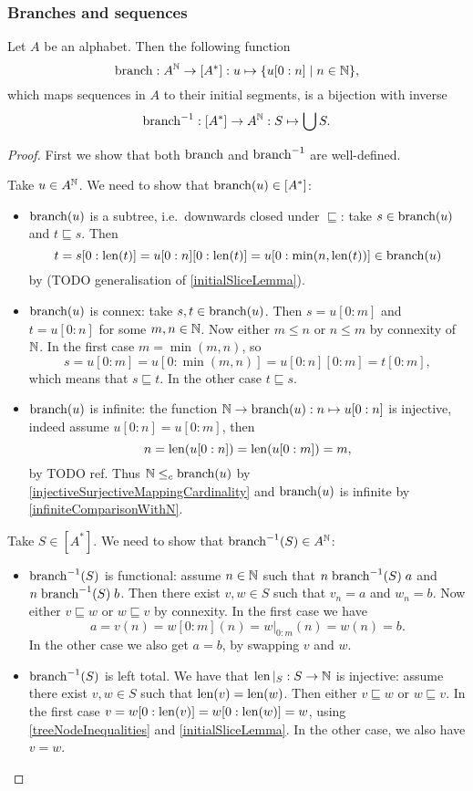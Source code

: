 \subsubsection{Branches and sequences}
\begin{proposition}
Let $A$ be an alphabet. Then the following function
\[ \branch: A^\N \to [A^*]: u \mapsto \setbuilder{u[0:n]}{n\in \N}, \]
which maps sequences in $A$ to their initial segments, is a bijection with inverse
\[ \operatorname{branch}^{-1}: [A^*] \to A^{\mathbb{N}}: S\mapsto \bigcup S. \]
\end{proposition}
\begin{proof}
First we show that both $\operatorname{branch}$ and $\operatorname{branch}^{-1}$ are well-defined.

Take $u\in A^{\mathbb{N}}$. We need to show that $\operatorname{branch}(u)\in[A^*]$:
\begin{itemize}
\item $\operatorname{branch}(u)$ is a subtree, i.e.\ downwards closed under $\sqsubseteq$: take $s\in \operatorname{branch}(u)$ and $t\sqsubseteq s$. Then 
\[ t = s[0:\operatorname{len}(t)] = u[0:n][0:\operatorname{len}(t)] = u[0:\min(n, \operatorname{len}(t))] \in \operatorname{branch}(u) \]
by (TODO generalisation of \ref{initialSliceLemma}).
\item $\operatorname{branch}(u)$ is connex: take $s,t\in \operatorname{branch}(u)$. Then $s = u[0:m]$ and $t = u[0:n]$ for some $m,n\in \mathbb{N}$. Now either $m\leq n$ or $n\leq m$ by connexity of $\mathbb{N}$. In the first case $m = \min(m,n)$, so
\[ s = u[0:m] = u[0:\min(m,n)] = u[0:n][0:m] = t[0:m], \]
which means that $s\sqsubseteq t$. In the other case $t\sqsubseteq s$.
\item $\operatorname{branch}(u)$ is infinite: the function $\mathbb{N}\to \operatorname{branch}(u): n\mapsto u[0:n]$ is injective, indeed assume $u[0:n] = u[0:m]$, then
\[ n = \operatorname{len}(u[0:n]) = \operatorname{len}(u[0:m]) = m, \]
by TODO ref. Thus $\mathbb{N}\leq_c \operatorname{branch}(u)$ by \ref{injectiveSurjectiveMappingCardinality} and $\operatorname{branch}(u)$ is infinite by \ref{infiniteComparisonWithN}.
\end{itemize}

Take $S\in [A^*]$. We need to show that $\operatorname{branch}^{-1}(S)\in A^{\mathbb{N}}$:
\begin{itemize}
\item $\operatorname{branch}^{-1}(S)$ is functional: assume $n\in \mathbb{N}$ such that $n\mathrel{\operatorname{branch}^{-1}(S)}a$ and $n\mathrel{\operatorname{branch}^{-1}(S)}b$. Then there exist $v,w\in S$ such that $v_n = a$ and $w_n = b$. Now either $v \sqsubseteq w$ or $w\sqsubseteq v$ by connexity. In the first case we have
\[ a = v(n) = w[0:m](n) = w|_{0:m}(n) = w(n) = b. \]
In the other case we also get $a=b$, by swapping $v$ and $w$.
\item $\operatorname{branch}^{-1}(S)$ is left total. We have that $\operatorname{len}|_S: S\to \mathbb{N}$ is injective: assume there exist $v,w\in S$ such that $\operatorname{len}(v) = \operatorname{len}(w)$. Then either $v\sqsubseteq w$ or $w\sqsubseteq v$. In the first case $v = w[0:\operatorname{len}(v)] = w[0:\operatorname{len}(w)] = w$, using \ref{treeNodeInequalities} and \ref{initialSliceLemma}. In the other case, we also have $v=w$. 


\end{itemize}
\end{proof}
